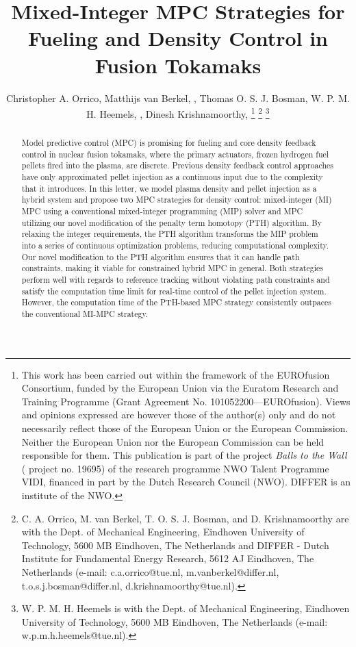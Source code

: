 \documentclass[journal,twoside,web]{ieeecolor}
\begin{document}
\title{Mixed-Integer MPC Strategies for Fueling and Density Control in Fusion Tokamaks}
\author{Christopher A. Orrico, Matthijs van Berkel, , Thomas O. S. J. Bosman, W. P. M. H. Heemels, , Dinesh Krishnamoorthy, 
\thanks{This work has been carried out within the framework of the EUROfusion Consortium, funded by the European Union via the Euratom Research and Training Programme (Grant Agreement No. 101052200—EUROfusion). Views and opinions expressed are however those of the author(s) only and do not necessarily reflect those of the European Union or the European Commission. Neither the European Union nor the European Commission can be held responsible for them. This publication is part of the project \textit{Balls to the Wall} ( project no. 19695) of the research programme NWO Talent Programme VIDI, financed in part by the Dutch Research Council (NWO). DIFFER is an institute of the NWO.}
\thanks{C. A. Orrico, M. van Berkel, T. O. S. J. Bosman, and D. Krishnamoorthy are with the Dept. of Mechanical Engineering, Eindhoven University of Technology, 5600 MB Eindhoven, The Netherlands and DIFFER - Dutch Institute for Fundamental Energy Research, 5612 AJ Eindhoven, The Netherlands (e-mail: c.a.orrico@tue.nl, m.vanberkel@differ.nl, t.o.s.j.bosman@differ.nl, d.krishnamoorthy@tue.nl).}
\thanks{W. P. M. H. Heemels is with the Dept. of Mechanical Engineering, Eindhoven University of Technology, 5600 MB Eindhoven, The Netherlands (e-mail: w.p.m.h.heemels@tue.nl).}
}

\maketitle
\thispagestyle{empty}

\begin{abstract}
Model predictive control (MPC) is promising for fueling and core density feedback control in nuclear fusion tokamaks, where the primary actuators, frozen hydrogen fuel pellets fired into the plasma, are discrete. Previous density feedback control approaches have only approximated pellet injection as a continuous input due to the complexity that it introduces. In this letter, we model plasma density and pellet injection as a hybrid system and propose two MPC strategies for density control: mixed-integer (MI) MPC using a conventional mixed-integer programming (MIP) solver and MPC utilizing our novel modification of the penalty term homotopy (PTH) algorithm. By relaxing the integer requirements, the PTH algorithm transforms the MIP problem into a series of continuous optimization problems, reducing computational complexity. Our novel modification to the PTH algorithm ensures that it can handle path constraints, making it viable for constrained hybrid MPC in general. Both strategies perform well with regards to reference tracking without violating path constraints and satisfy the computation time limit for real-time control of the pellet injection system. However, the computation time of the PTH-based MPC strategy consistently outpaces the conventional MI-MPC strategy. 

\end{abstract}
\end{document}
